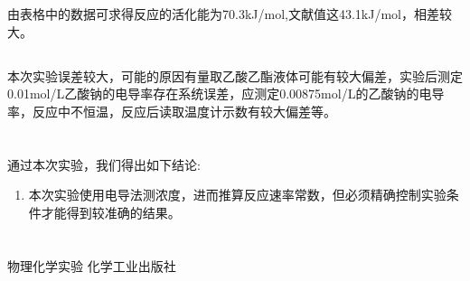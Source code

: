 ﻿\documentclass[10.5pt]{ctexart}
\begin{document}
由表格中的数据可求得反应的活化能为70.3kJ/mol,文献值这43.1kJ/mol，相差较大。


\subsection{\textbf{}}
本次实验误差较大，可能的原因有量取乙酸乙酯液体可能有较大偏差，实验后测定0.01mol/L乙酸钠的电导率存在系统误差，应测定0.00875mol/L的乙酸钠的电导率，反应中不恒温，反应后读取温度计示数有较大偏差等。

\section{\textbf{}}

通过本次实验，我们得出如下结论:
\begin{enumerate}
\item 本次实验使用电导法测浓度，进而推算反应速率常数，但必须精确控制实验条件才能得到较准确的结果。
\end{enumerate}

\section{\textbf{}}
\begin{thebibliography}{}
物理化学实验 \quad 化学工业出版社
\end{thebibliography}
\end{document}
